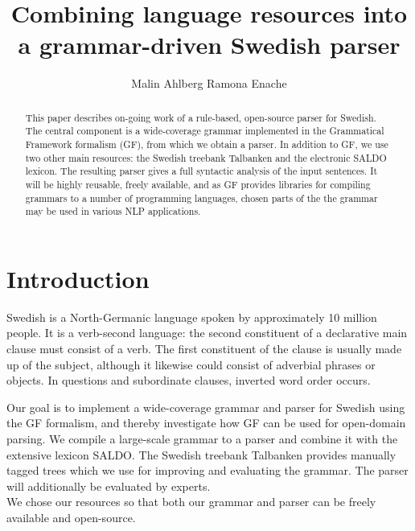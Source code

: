 \documentclass[submission]{eptcs} %
\title{%
        Combining language resources into a grammar-driven Swedish parser}
\author{Malin Ahlberg \qquad\qquad Ramona Enache
\institute{Department of Computer Science \& Engineering, Gothenburg University, Sweden}
}
\begin{document}
\maketitle

\begin{abstract}
This paper describes on-going work of a rule-based, open-source
parser for Swedish. The central component is a wide-coverage grammar
implemented in the Grammatical Framework formalism (GF), from which
we obtain a %
parser.
In addition to GF, we use two other main resources: the Swedish
treebank Talbanken and the electronic SALDO lexicon.
The resulting parser 
gives a full syntactic analysis of the input sentences.
It will be highly reusable, freely available,
and as GF provides libraries for compiling
grammars to a number of programming languages,
chosen parts of the the 
grammar may be used in various NLP applications. %

\end{abstract}

\section{Introduction}
Swedish is a North-Germanic language spoken by approximately 10 million people.
It is a verb-second language: the second constituent of a declarative main
clause must consist of a verb.
The first constituent of the clause is usually made up of the subject,
although it likewise could consist of adverbial phrases or objects.
In questions and subordinate clauses, inverted word order occurs.

Our goal is to implement a wide-coverage grammar and parser for Swedish
using the GF formalism, and 
thereby investigate how GF can be used for open-domain parsing.
We compile a large-scale grammar to a parser
and combine it with the extensive lexicon SALDO. The Swedish treebank 
Talbanken provides manually tagged trees which we use for improving and evaluating
the grammar. The parser will additionally
be evaluated by experts. \\
We chose our resources so that both our grammar and parser can 
be freely available and open-source. 
\end{document}
